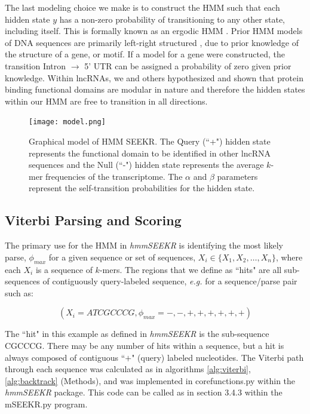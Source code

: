 The last modeling choice we make is to construct the HMM such that each hidden state $y$ has a non-zero probability of transitioning to any other state, including itself. This is formally known as an ergodic HMM \cite{Rabiner1989ARecognition}. Prior HMM models of DNA sequences are primarily left-right structured \cite{Burge1997PredictionDNA,Pachter2002ApplicationsProblems,Henderson1997FindingModel,Wheeler2013Nhmmer:HMMs}, due to prior knowledge of the structure of a gene, or motif. If a model for a gene were constructed, the transition Intron $\rightarrow$ 5' UTR can be assigned a probability of zero given prior knowledge. Within lncRNAs, we and others hypothesized and shown that protein binding functional domains are modular in nature and therefore the hidden states within our HMM are free to transition in all directions.

\begin{figure}[h]
\centering
\texttt{[image: model.png]}
\caption[Graphical model of \emph{hmmSEEKR}]{Graphical model of HMM SEEKR. The Query (``+") hidden state represents the functional domain to be identified in other lncRNA sequences and the Null (``-") hidden state represents the average $k$-mer frequencies of the transcriptome. The $\alpha$ and $\beta$ parameters represent the self-transition probabilities for the hidden state. }
\label{fig:hmmseekrmodel}
\end{figure}

\subsection{Viterbi Parsing and Scoring}
The primary use for the HMM in \emph{hmmSEEKR} is identifying the most likely parse, $\phi_{max}$ for a given sequence or set of sequences, $X_i \in \{X_1,X_2,\dots,X_n\}$, where each $X_i$ is a sequence of $k$-mers. The regions that we define as ``hits" are all sub-sequences of contiguously query-labeled sequence, \emph{e.g.} for a sequence/parse pair such as:

$$(X_i=ATCGCCCG,\phi_{max}=-,-,+,+,+,+,+,+)$$

The ``hit" in this example as defined in \emph{hmmSEEKR} is the sub-sequence CGCCCG. There may be any number of hits within a sequence, but a hit is always composed of contiguous ``$+$" (query) labeled nucleotides.  The Viterbi path through each sequence was calculated as in algorithms \ref{alg:viterbi}, \ref{alg:backtrack} (Methods), and was implemented in corefunctions.py within the \emph{hmmSEEKR} package. This code can be called as in section 3.4.3 within the mSEEKR.py program.


